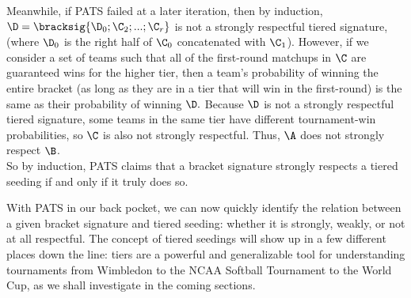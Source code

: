 {{        Meanwhile, if PATS failed at a later iteration, then by induction, $\D = \bracksig{\D_0; \C_2; ...; \C_{r}}$ is not a strongly respectful tiered signature, (where $\D_0$ is the right half of $\C_0$ concatenated with $\C_1$). However, if we consider a set of teams such that all of the first-round matchups in $\C$ are guaranteed wins for the higher tier, then a team's probability of winning the entire bracket (as long as they are in a tier that will win in the first-round) is the same as their probability of winning $\D.$ Because $\D$ is not a strongly respectful tiered signature, some teams in the same tier have different tournament-win probabilities, so $\C$ is also not strongly respectful. Thus, $\A$ does not strongly respect $\B$.\\

        So by induction, PATS claims that a bracket signature strongly respects a tiered seeding if and only if it truly does so.
    }{}

    With PATS in our back pocket, we can now quickly identify the relation between a given bracket signature and tiered seeding: whether it is strongly, weakly, or not at all respectful. The concept of tiered seedings will show up in a few different places down the line: tiers are a powerful and generalizable tool for understanding tournaments from Wimbledon to the NCAA Softball Tournament to the World Cup, as we shall investigate in the coming sections.
}